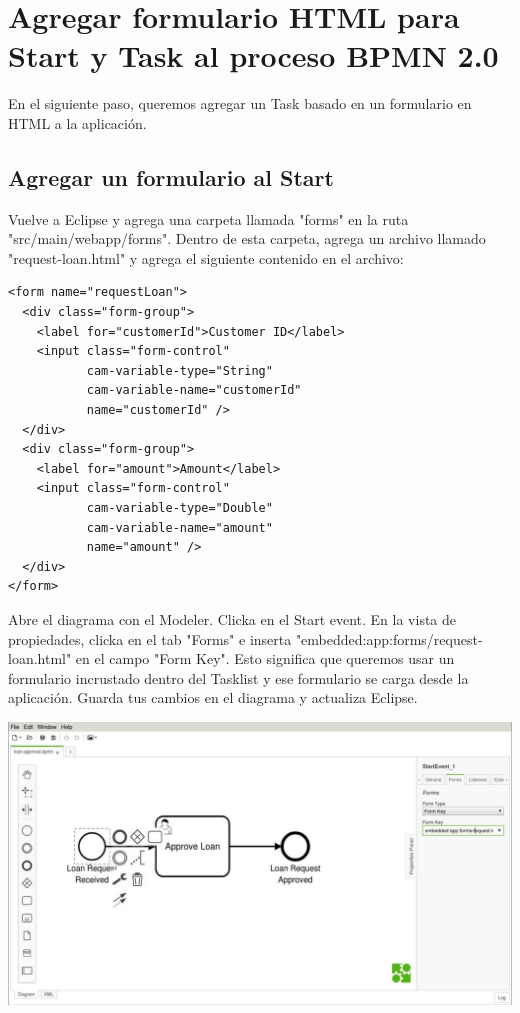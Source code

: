 \documentclass{article}
\begin{document}
\newpage
\section{Agregar formulario HTML para Start y Task al proceso BPMN 2.0}

En el siguiente paso, queremos agregar un Task basado en un formulario en HTML a la aplicación.

\subsection{Agregar un formulario al Start}

Vuelve a Eclipse y agrega una carpeta llamada "forms" en la ruta "src/main/webapp/forms". Dentro de esta carpeta, agrega un archivo llamado "request-loan.html" y agrega el siguiente contenido en el archivo:

\begin{verbatim}
<form name="requestLoan">
  <div class="form-group">
    <label for="customerId">Customer ID</label>
    <input class="form-control"
           cam-variable-type="String"
           cam-variable-name="customerId"
           name="customerId" />
  </div>
  <div class="form-group">
    <label for="amount">Amount</label>
    <input class="form-control"
           cam-variable-type="Double"
           cam-variable-name="amount"
           name="amount" />
  </div>
</form>
\end{verbatim}

Abre el diagrama con el Modeler. Clicka en el Start event. En la vista de propiedades, clicka en el tab "Forms" e inserta "embedded:app:forms/request-loan.html" en el campo "Form Key". Esto significa que queremos usar un formulario incrustado dentro del Tasklist y ese formulario se carga desde la aplicación.
Guarda tus cambios en el diagrama y actualiza Eclipse.

\begin{center}
\includegraphics[width=\textwidth]{modeler-start-form.png}
\end{center}
\end{document}
